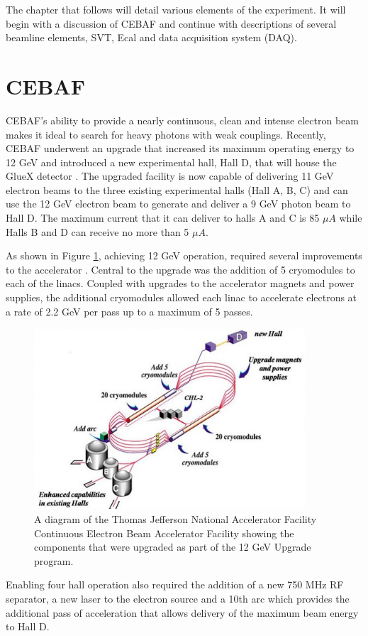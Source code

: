 The chapter that follows will detail various elements of the experiment.
It will begin with a discussion of CEBAF and continue with descriptions
of several beamline elements, SVT, Ecal and data acquisition system (DAQ).

\section{CEBAF}

CEBAF's ability to provide a nearly continuous, clean and intense electron
beam makes it ideal to search for heavy photons with weak couplings. Recently,
CEBAF underwent an upgrade that increased its maximum operating energy to 12
GeV and introduced a new experimental hall, Hall D, that will house the
GlueX detector \cite{Dudek:2012vr}.  The upgraded facility is now capable of 
delivering 11 GeV electron beams to the three existing experimental halls
(Hall A, B, C) and can use the 12 GeV electron beam to generate and deliver a 9
GeV photon beam to Hall D.  The maximum current that it can deliver to halls
A and C is 85 $\mu A$ while Halls B and D can receive no more than 5 $\mu A$.

As shown in Figure \ref{fig:cebaf}, achieving 12 GeV operation, required several
improvements to the accelerator \cite{Burkert:2012rh}. Central to the upgrade 
was the addition of 5 
cryomodules to each of the linacs.  Coupled with upgrades to the accelerator
magnets and power supplies, the additional cryomodules allowed each linac to
accelerate electrons at a rate of 2.2 GeV per pass up to a maximum of 5 passes.
\begin{figure}[h]
    \centering
    \includegraphics[width=0.9\textwidth]{images/cebaf.jpg}
    \caption{A diagram of the Thomas Jefferson National Accelerator Facility
             Continuous Electron Beam Accelerator Facility showing the 
             components that were upgraded as part of the 12 GeV Upgrade 
             program.}
    \label{fig:cebaf}
\end{figure}
Enabling four hall operation also required the addition of a new 750 MHz RF 
separator, a new laser to the electron source and a 10th arc which provides
the additional pass of acceleration that allows 
delivery of the maximum beam energy to Hall D.


